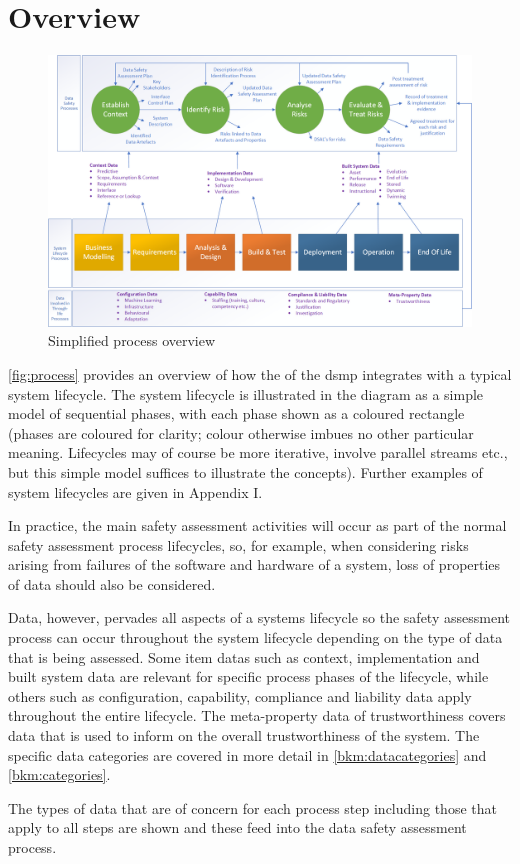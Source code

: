 \section{Overview}
\begin{figure}[h]
	\centering
	\includegraphics[angle=90,scale=0.6]{images/process_diagram}
	\caption{Simplified process overview}
	\label{fig:process}
\end{figure}
\autoref{fig:process} provides an overview of how the of the \gls{dsmp}
integrates with a typical system lifecycle. 
The system lifecycle is illustrated in the diagram as a simple
model of sequential phases, with each phase shown as a coloured rectangle (phases are coloured for
clarity; colour otherwise imbues no other particular meaning. Lifecycles may of course be more
iterative, involve parallel streams etc., but this simple model suffices to illustrate the concepts).
Further examples of system lifecycles are given in Appendix I.

In practice, the main \gls{safety assessment} activities will
occur as part of the normal safety assessment process lifecycles, so, for example, when considering risks arising
from failures of the software and hardware of a system, loss of properties of data should also be
considered.

Data, however, pervades all aspects of a systems lifecycle so the \gls{safety assessment}
process can occur throughout the system lifecycle depending on the type of data that is being
assessed. Some \glspl{item data} such as context, implementation and built system data are relevant for
specific process phases of the lifecycle, while others such as configuration, capability, compliance and
liability data apply throughout the entire lifecycle. The meta-property data of trustworthiness
covers data that is used to inform on the overall trustworthiness of the system. The specific data
categories are covered in more detail in \autoref{bkm:datacategories} and \autoref{bkm:categories}.

The types of data that are of concern for each process step including those that apply to all steps are
shown and these feed into the data safety assessment process.

